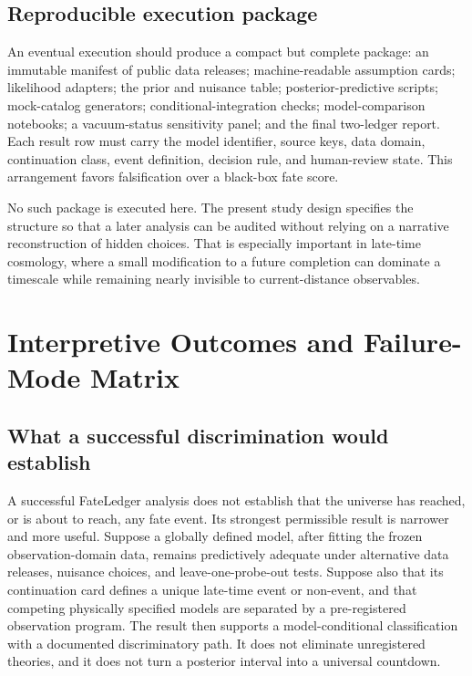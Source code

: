 \documentclass[conference]{IEEEtran}
\begin{document}
\subsection{Reproducible execution package}

An eventual execution should produce a compact but complete package: an immutable manifest of public data releases; machine-readable assumption cards; likelihood adapters; the prior and nuisance table; posterior-predictive scripts; mock-catalog generators; conditional-integration checks; model-comparison notebooks; a vacuum-status sensitivity panel; and the final two-ledger report. Each result row must carry the model identifier, source keys, data domain, continuation class, event definition, decision rule, and human-review state. This arrangement favors falsification over a black-box fate score.

No such package is executed here. The present study design specifies the structure so that a later analysis can be audited without relying on a narrative reconstruction of hidden choices. That is especially important in late-time cosmology, where a small modification to a future completion can dominate a timescale while remaining nearly invisible to current-distance observables.
\section{Interpretive Outcomes and Failure-Mode Matrix}

\subsection{What a successful discrimination would establish}

A successful FateLedger analysis does not establish that the universe has reached, or is about to reach, any fate event. Its strongest permissible result is narrower and more useful. Suppose a globally defined model, after fitting the frozen observation-domain data, remains predictively adequate under alternative data releases, nuisance choices, and leave-one-probe-out tests. Suppose also that its continuation card defines a unique late-time event or non-event, and that competing physically specified models are separated by a pre-registered observation program. The result then supports a model-conditional classification with a documented discriminatory path. It does not eliminate unregistered theories, and it does not turn a posterior interval into a universal countdown.
\end{document}
